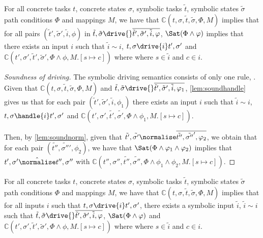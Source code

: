 \begin{lemma}
  \label{lem:sounddriving}
  For all concrete tasks $t$, concrete states $\sigma$, symbolic tasks $\tilde{t}$, symbolic states $\tilde{\sigma}$ path conditions $\Phi$ and mappings $M$,
  we have that $\mathds{C}(t,\sigma,\tilde{t},\tilde{\sigma},\Phi,M)$ implies
  that for all pairs $(\tilde{t}',\tilde{\sigma}',\tilde{i},\phi)$ in $\tilde{t},\tilde{\sigma}\drive{}\overline{\tilde{t}',\tilde{\sigma}',\tilde{i},\phi}$,
  $\Sat(\Phi\land\phi)$ implies that there exists an input $i$ such that $\tilde{i}\sim i$,  $t,\sigma\drive{i}t',\sigma'$ and $\mathds{C}(t',\sigma',\tilde{t}',\tilde{\sigma}',\Phi\land\phi,M.[s\mapsto c])$ where where $s\in\tilde{i}$ and $c\in i$.
\end{lemma}

\begin{proof}[Soundness of driving]
  The symbolic driving semantics consists of only one rule, .
  Given that $\mathds{C}(t,\sigma,\tilde{t},\tilde{\sigma},\Phi,M)$ and $\tilde{t},\tilde{\sigma}\drive{}\overline{\tilde{t}',\tilde{\sigma}',\tilde{i},\phi_1}$,
  \cref{lem:soundhandle} gives us that for each pair $(\tilde{t}',\tilde{\sigma}',\tilde{i},\phi_1)$
  there exists an input $i$ such that $\tilde{i}\sim i$, $t,\sigma\handle{i}t',\sigma'$
  and $\mathds{C}(t',\sigma',\tilde{t'},\tilde{\sigma'},\Phi\land\phi_1,M.[s\mapsto c])$.

  Then, by \cref{lem:soundnorm}, given that $\tilde{t'},\tilde{\sigma'}\normalise\overline{\tilde{t''},\tilde{\sigma''}',\phi_2}$,
  we obtain that for each pair $(\tilde{t''},\tilde{\sigma''}',\phi_2)$, we have that $\Sat(\Phi\land\phi_1\land\phi_2)$ implies
  that $t',\sigma'\hat{\normalise}t'',\sigma''$ with $\mathds{C}(t'',\sigma'',\tilde{t''},\tilde{\sigma''},\Phi\land\phi_1\land\phi_2,M.[s\mapsto c])$.
\end{proof}



\begin{lemma}
  \label{lem:completedriving}
  For all concrete tasks $t$, concrete states $\sigma$, symbolic tasks $\tilde{t}$, symbolic states $\tilde{\sigma}$ path conditions $\Phi$ and mappings $M$,
  we have that $\mathds{C}(t,\sigma,\tilde{t},\tilde{\sigma},\Phi,M)$ implies
  that for all inputs $i$ such that $t,\sigma\drive{i}t',\sigma'$,
  there exists a symbolic input $\tilde{i}$, $\tilde{i}\sim i$ such that
  $\tilde{t},\tilde{\sigma}\drive{}\overline{\tilde{t}',\tilde{\sigma}',\tilde{i},\phi}$, $\Sat(\Phi\land\phi)$ and $\mathds{C}(t',\sigma',\tilde{t}',\tilde{\sigma}',\Phi\land\phi,M.[s\mapsto c])$ where where $s\in\tilde{i}$ and $c\in i$.
\end{lemma}

